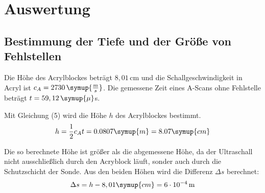 \section{Auswertung}
\label{sec:Auswertung}

\subsection{Bestimmung  der Tiefe und der Größe von Fehlstellen}

Die Höhe des Acrylblockes beträgt $8,01\,$cm und die Schallgeschwindigkeit in Acryl ist $c_A=2730 \, \symup{\frac{m}{s}}$.
Die gemessene Zeit eines A-Scans ohne Fehlstelle beträgt $t =59,12\, \symup{\mu}$s.

Mit Gleichung (5) wird die Höhe $h$ des Acrylblockes bestimmt.
\begin{align*}
  h = \frac{1}{2} c_A t = 0.0807 \symup{m} = 8.07  \symup{cm}
\end{align*}

Die so berechnete Höhe ist größer als die abgemessene Höhe, da der Ultraschall nicht ausschließlich durch den Acryblock läuft, sonder auch durch die
Schutzschicht der Sonde. Aus den beiden Höhen wird die Differenz $\Delta s$ berechnet:
\begin{align*}
  \Delta s = h - 8,01 \symup{cm} = \SI{6e-4}{\meter}
\end{align*}


